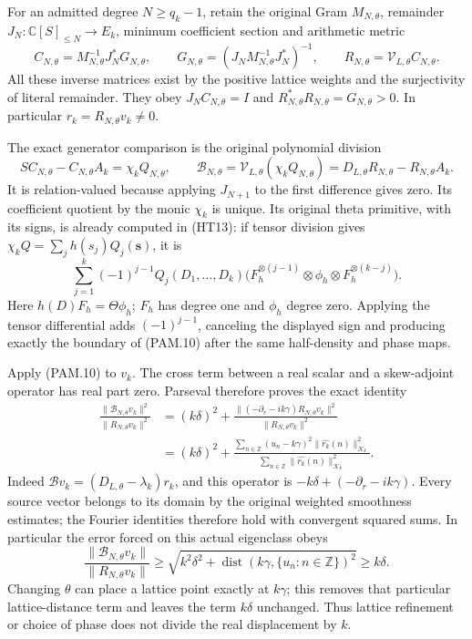 For an admitted degree \(N\ge q_k-1\), retain the original Gram
\(M_{N,\theta}\), remainder \(J_N:\mathbb C[S]_{\le N}\to E_k\),
minimum coefficient section and arithmetic metric
\[
 C_{N,\theta}=M_{N,\theta}^{-1}J_N^*G_{N,\theta},\qquad
 G_{N,\theta}=(J_NM_{N,\theta}^{-1}J_N^*)^{-1},\qquad
 R_{N,\theta}=\mathcal V_{L,\theta}C_{N,\theta}.
 \tag{PAM.9}\label{eq:pam-section}
\]
All these inverse matrices exist by the positive lattice weights and
the surjectivity of literal remainder. They obey
\(J_NC_{N,\theta}=I\) and \(R_{N,\theta}^*R_{N,\theta}=G_{N,\theta}>0\).
In particular \(r_k=R_{N,\theta}v_k\ne0\).

The exact generator comparison is the original polynomial division
\[
 SC_{N,\theta}-C_{N,\theta}A_k=\chi_k Q_{N,\theta},\qquad
 \mathscr B_{N,\theta}
 =\mathcal V_{L,\theta}(\chi_k Q_{N,\theta})
 =D_{L,\theta}R_{N,\theta}-R_{N,\theta}A_k .
 \tag{PAM.10}\label{eq:pam-boundary}
\]
It is relation-valued because applying \(J_{N+1}\) to the first
difference gives zero. Its coefficient quotient by the monic
\(\chi_k\) is unique. Its original theta primitive, with its signs,
is already computed in (HT13): if tensor division gives
\(\chi_kQ=\sum_jh(s_j)Q_j(\mathbf s)\), it is
\[
 \sum_{j=1}^k(-1)^{j-1}Q_j(D_1,\ldots,D_k)
 \bigl(F_h^{\otimes(j-1)}\otimes\phi_h\otimes
                         F_h^{\otimes(k-j)}\bigr).
 \tag{PAM.11}\label{eq:pam-primitive}
\]
Here \(h(D)F_h=\Theta\phi_h\); \(F_h\) has degree one and
\(\phi_h\) degree zero. Applying the tensor differential adds
\((-1)^{j-1}\), canceling the displayed sign and producing exactly
the boundary of (PAM.10) after the same half-density and phase maps.

Apply (PAM.10) to \(v_k\). The cross term between a real scalar and
a skew-adjoint operator has real part zero. Parseval therefore proves
the exact identity
\[
 \begin{split}
 \frac{\|\mathscr B_{N,\theta}v_k\|^2}{\|R_{N,\theta}v_k\|^2}
 &=(k\delta)^2+
 \frac{\|(-\partial_r-ik\gamma)R_{N,\theta}v_k\|^2}
      {\|R_{N,\theta}v_k\|^2}\\
 &=(k\delta)^2+
 \frac{\sum_{n\in\mathbb Z}(u_n-k\gamma)^2
                   \|\widehat{r_k}(n)\|_{\mathcal K_k}^2}
      {\sum_{n\in\mathbb Z}\|\widehat{r_k}(n)\|_{\mathcal K_k}^2}.
 \end{split}
 \tag{PAM.12}\label{eq:pam-exactdistance}
\]
Indeed \(\mathscr Bv_k=(D_{L,\theta}-\lambda_k)r_k\), and this
operator is \(-k\delta+(-\partial_r-ik\gamma)\).
Every source vector belongs to its domain by the original weighted
smoothness estimates; the Fourier identities therefore hold with
convergent squared sums.
In particular the error forced on this actual eigenclass obeys
\[
 \frac{\|\mathscr B_{N,\theta}v_k\|}{\|R_{N,\theta}v_k\|}
 \ge\sqrt{k^2\delta^2+
              \operatorname{dist}(k\gamma,\{u_n:n\in\mathbb Z\})^2}
 \ge k\delta .
 \tag{PAM.13}\label{eq:pam-errorlower}
\]
Changing \(\theta\) can place a lattice point exactly at \(k\gamma\);
this removes that particular lattice-distance term and leaves
the term \(k\delta\) unchanged. Thus lattice refinement or choice
of phase does not divide the real displacement by \(k\).

